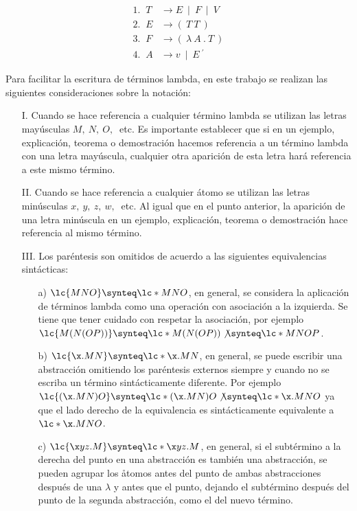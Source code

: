 \begin{align*} \text{1. }\ T &\rightarrow E\ \mid\ F\ \mid\ V\\ \text{2. }\ E
&\rightarrow (\ T\ T\ )\\ \text{3. }\ F &\rightarrow (\ \lambda\ A\ .\ T\ )\\
\text{4. }\ A &\rightarrow v\ \mid\ E\ {}^{\prime}
\end{align*}

Para facilitar la escritura de términos lambda, en este trabajo se realizan las
siguientes consideraciones sobre la notación:

\begin{itemize}
\item[I.] Cuando se hace referencia a cualquier término lambda se utilizan las
letras mayúsculas \(M,\ N,\ O,\ \) etc. Es importante establecer que si en un
ejemplo, explicación, teorema o demostración hacemos referencia a un término
lambda con una letra mayúscula, cualquier otra aparición de esta letra hará
referencia a este mismo término.
\item[II.] Cuando se hace referencia a cualquier átomo se utilizan las letras
minúsculas \(x,\ y,\ z,\ w,\ \) etc. Al igual que en el punto anterior, la
aparición de una letra minúscula en un ejemplo, explicación, teorema o
demostración hace referencia al mismo término.
\item[III.] Los paréntesis son omitidos de acuerdo a las siguientes
equivalencias sintácticas:
  \begin{itemize}
  \item[a)] \(\lc{M N O} \synteq \lc*{M N O}\), en general, se considera la
aplicación de términos lambda como una operación con asociación a la izquierda.
Se tiene que tener cuidado con respetar la asociación, por ejemplo \(\lc{M(N(O
P))} \synteq \lc*{M(N(O P))} \not\synteq \lc*{M N O P}\).
  \item[b)] \(\lc{\x.M N} \synteq \lc*{\x.M N}\), en general, se puede escribir
una abstracción omitiendo los paréntesis externos siempre y cuando no se escriba
un término sintácticamente diferente. Por ejemplo \(\lc{(\x.M N) O} \synteq
\lc*{(\x.M N) O} \not\synteq \lc*{\x.M N O}\) ya que el lado derecho de la
equivalencia es sintácticamente equivalente a \(\lc*{\x.M N O}\).
  \item[c)] \(\lc{\x y z.M} \synteq \lc*{\x y z.M}\), en general, si el
subtérmino a la derecha del punto en una abstracción es también una abstracción,
se pueden agrupar los åtomos antes del punto de ambas abstracciones después de
una \(\lambda\) y antes que el punto, dejando el subtérmino después del punto de
la segunda abstracción, como el del nuevo término.
  \end{itemize}
\end{itemize}

